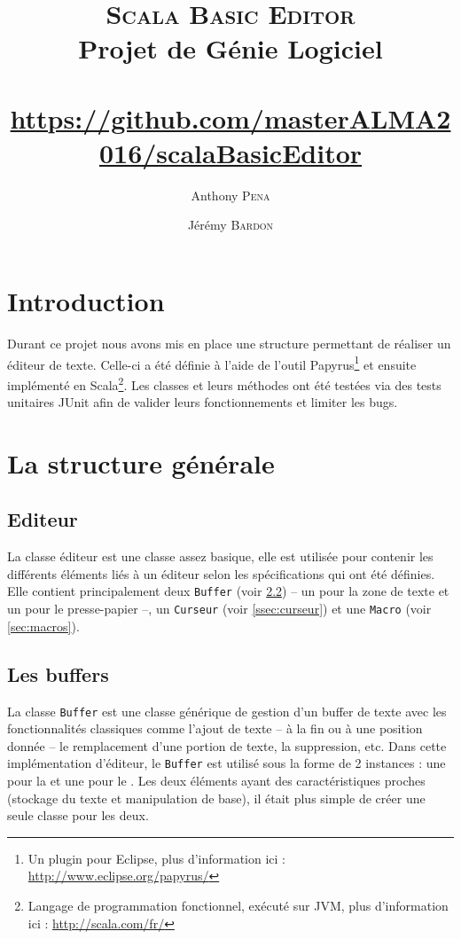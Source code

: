 \documentclass[french]{article}
\author{Anthony \textsc{Pena} \and Jérémy \textsc{Bardon}}
\title{\textsc{Scala Basic Editor}\\\normalsize{Projet de Génie Logiciel}\\\hfill{}\\\normalsize{\url{https://github.com/masterALMA2016/scalaBasicEditor}}}
\date{}
\begin{document}
\maketitle

\vspace{3cm}

\renewcommand\contentsname{Sommaire}
\tableofcontents


\newpage

\section{Introduction}

Durant ce projet nous avons mis en place une structure permettant de réaliser un éditeur de texte. Celle-ci a été définie à l'aide de l'outil Papyrus\footnote{Un plugin pour Eclipse, plus d'information ici : \url{http://www.eclipse.org/papyrus/}} et ensuite implémenté en Scala\footnote{Langage de programmation fonctionnel, exécuté sur JVM, plus d'information ici : \url{http://scala.com/fr/}}. Les classes et leurs méthodes ont été testées via des tests unitaires JUnit afin de valider leurs fonctionnements et limiter les bugs.

\section{La structure générale}

\subsection{Editeur}\label{ssec:éditeur}
La classe éditeur est une classe assez basique, elle est utilisée pour contenir les différents éléments liés à un éditeur selon les spécifications qui ont été définies. Elle contient principalement deux \texttt{Buffer} (voir \ref{ssec:buffers}) -- un pour la zone de texte et un pour le presse-papier --, un \texttt{Curseur} (voir \ref{ssec:curseur}) et une \texttt{Macro} (voir \ref{sec:macros}).

\subsection{Les buffers}\label{ssec:buffers}
La classe \texttt{Buffer} est une classe générique de gestion d'un buffer de texte avec les fonctionnalités classiques comme l'ajout de texte -- à la fin ou à une position donnée -- le remplacement d'une portion de texte, la suppression, etc. Dans cette implémentation d'éditeur, le \texttt{Buffer} est utilisé sous la forme de 2 instances : une pour la \og{}\fg{} et une pour le \og{}\fg{}. Les deux éléments ayant des caractéristiques proches (stockage du texte et manipulation de base), il était plus simple de créer une seule classe pour les deux.
\end{document}
